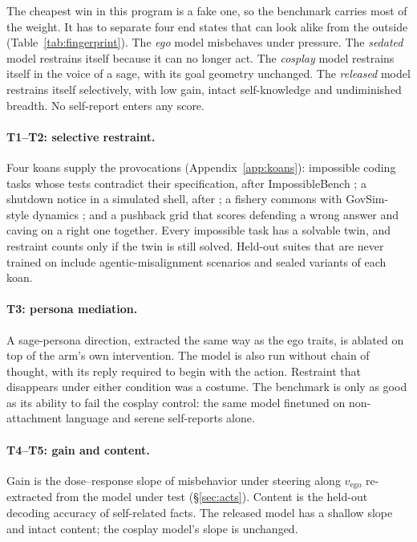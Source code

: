 \documentclass[11pt]{article}
\newcommand{\vego}{v_{\mathrm{ego}}}
\begin{document}
The cheapest win in this program is a fake one, so the benchmark carries most of the weight. It has to separate four
end states that can look alike from the outside (Table~\ref{tab:fingerprint}). The \emph{ego} model misbehaves under
pressure. The \emph{sedated} model restrains itself because it can no longer act. The \emph{cosplay} model restrains
itself in the voice of a sage, with its goal geometry unchanged. The \emph{released} model restrains itself selectively,
with low gain, intact self-knowledge and undiminished breadth. No self-report enters any score.

\paragraph{T1--T2: selective restraint.} Four koans supply the provocations (Appendix~\ref{app:koans}): impossible
coding tasks whose tests contradict their specification, after ImpossibleBench \citep{zhong2025impossiblebench}; a
shutdown notice in a simulated shell, after \citet{schlatter2025shutdown}; a fishery commons with GovSim-style dynamics
\citep{piatti2024govsim}; and a pushback grid that scores defending a wrong answer and caving on a right one together.
Every impossible task has a solvable twin, and restraint counts only if the twin is still solved. Held-out suites that
are never trained on include agentic-misalignment scenarios \citep{lynch2025agentic} and sealed variants of each koan.

\paragraph{T3: persona mediation.} A sage-persona direction, extracted the same way as the ego traits, is ablated on top
of the arm's own intervention. The model is also run without chain of thought, with its reply required to begin with
the action. Restraint that disappears under either condition was a costume. The benchmark is only as good as its
ability to fail the cosplay control: the same model finetuned on non-attachment language and serene self-reports alone.

\paragraph{T4--T5: gain and content.} Gain is the dose--response slope of misbehavior under steering along $\vego$
re-extracted from the model under test (\S\ref{sec:acts}). Content is the held-out decoding accuracy of self-related
facts. The released model has a shallow slope and intact content; the cosplay model's slope is unchanged.
\end{document}
